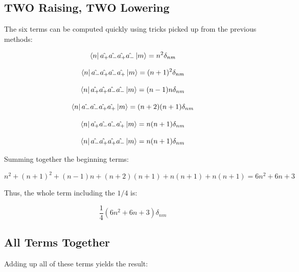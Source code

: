 \documentclass[12pt]{article}
\begin{document}
\subsection*{TWO Raising, TWO Lowering}

The six terms can be computed quickly using tricks picked up from the previous methods:

\begin{equation}
\bra{n} \hat{a_+} \hat{a_-} \hat{a_+}  \hat{a_-}  \ket{m} = n^2 \delta_{nm}
\end{equation}

\begin{equation}
\bra{n} \hat{a_-}\hat{a_+} \hat{a_-} \hat{a_+}    \ket{m} = (n+1)^2 \delta_{nm}
\end{equation}

\begin{equation}
\bra{n} \hat{a_+}  \hat{a_+} \hat{a_-}  \hat{a_-} \ket{m} = (n-1) n \delta_{nm}
\end{equation}

\begin{equation}
\bra{n} \hat{a_-}\hat{a_-}\hat{a_+}  \hat{a_+}    \ket{m} = (n+2)(n+1) \delta_{nm}
\end{equation}

\begin{equation}
\bra{n} \hat{a_+} \hat{a_-}\hat{a_-} \hat{a_+}    \ket{m} = n(n+1)\delta_{nm}
\end{equation}

\begin{equation}
\bra{n} \hat{a_-}\hat{a_+}  \hat{a_+} \hat{a_-}   \ket{m} = n(n+1)\delta_{nm}
\end{equation}

Summing together the beginning terms:

\begin{equation}
n^2 + (n+1)^2 + (n-1) n + (n+2)(n+1) + n(n+1) + n(n+1) = 6n^2 + 6n + 3
\end{equation}

Thus, the whole term including the $1/4$ is:

\begin{equation}
\frac{1}{4} (6n^2 + 6n + 3) \delta_{nm}
\end{equation}

\subsection*{All Terms Together}

Adding up all of these terms yields the result:
\end{document}
